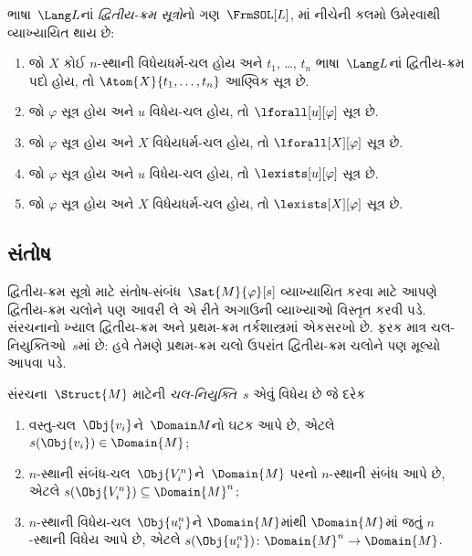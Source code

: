 \begin{defn}
ભાષા~$\Lang L$નાં \emph{દ્વિતીય-ક્રમ સૂત્રો}નો
ગણ~$\FrmSOL[L]$, માં નીચેની કલમો
ઉમેરવાથી વ્યાખ્યાયિત થાય છે:
\begin{enumerate}
\item જો $X$ કોઈ $n$-સ્થાની વિધેયધર્મ-ચલ હોય અને $t_1$, \dots,
  $t_n$ ભાષા~$\Lang L$નાં દ્વિતીય-ક્રમ પદો હોય, તો
  $\Atom{X}{t_1,\ldots, t_n}$ આણ્વિક સૂત્ર છે.

\item જો $\varphi$ સૂત્ર હોય અને $u$ વિધેય-ચલ હોય,
  તો $\lforall[u][\varphi]$ સૂત્ર છે.

\item જો $\varphi$ સૂત્ર હોય અને $X$ વિધેયધર્મ-ચલ હોય,
  તો $\lforall[X][\varphi]$ સૂત્ર છે.

\item જો $\varphi$ સૂત્ર હોય અને $u$ વિધેય-ચલ હોય,
  તો $\lexists[u][\varphi]$ સૂત્ર છે.

\item જો $\varphi$ સૂત્ર હોય અને $X$ વિધેયધર્મ-ચલ હોય,
  તો $\lexists[X][\varphi]$ સૂત્ર છે.
\end{enumerate}
\end{defn}





\subsection{સંતોષ}\label{sol:syn:sat:sec}

\begin{explain}
દ્વિતીય-ક્રમ સૂત્રો માટે સંતોષ-સંબંધ~$\Sat{M}{\varphi}[s]$
વ્યાખ્યાયિત કરવા માટે આપણે દ્વિતીય-ક્રમ ચલોને પણ આવરી લે
એ રીતે અગાઉની વ્યાખ્યાઓ વિસ્તૃત કરવી પડે. સંરચનાનો ખ્યાલ
દ્વિતીય-ક્રમ અને પ્રથમ-ક્રમ તર્કશાસ્ત્રમાં એકસરખો છે. ફરક માત્ર
ચલ-નિયુક્તિઓ~$s$માં છે: હવે તેમણે પ્રથમ-ક્રમ ચલો ઉપરાંત
દ્વિતીય-ક્રમ ચલોને પણ મૂલ્યો આપવા પડે.
\end{explain}

\begin{defn}[ચલ-નિયુક્તિ]
સંરચના~$\Struct{M}$ માટેની \emph{ચલ-નિયુક્તિ}~$s$ એવું
વિધેય છે જે દરેક
\begin{enumerate}
\item વસ્તુ-ચલ~$\Obj{v_i}$ને~$\Domain M$નો ઘટક આપે છે,
  એટલે $s(\Obj{v_i}) \in \Domain{M}$;
\item $n$-સ્થાની સંબંધ-ચલ~$\Obj{V_i^n}$ને~$\Domain{M}$ પરનો
  $n$-સ્થાની સંબંધ આપે છે, એટલે
  $s(\Obj{V_i^n}) \subseteq \Domain{M}^n$;
\item $n$-સ્થાની વિધેય-ચલ~$\Obj{u_i^n}$ને $\Domain{M}$માંથી
  $\Domain{M}$માં જતું $n$-સ્થાની વિધેય આપે છે, એટલે
  $s(\Obj{u_i^n})\colon \Domain{M}^n \to \Domain{M}$.
\end{enumerate}
\end{defn}


